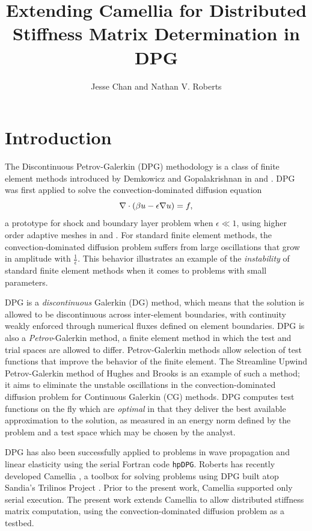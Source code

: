 \documentclass{article}
\date{}
\author{Jesse Chan and Nathan V. Roberts}
\title{Extending Camellia for Distributed Stiffness Matrix Determination in DPG}
\begin{document}
\maketitle

\section{Introduction}

The Discontinuous Petrov-Galerkin (DPG) methodology is a class of finite element methods introduced by Demkowicz and Gopalakrishnan in \cite{DPG1} and \cite{DPG2}. DPG was first applied to solve the convection-dominated diffusion equation
\[
\div \left(\beta u - \epsilon\grad u\right) = f,
\]
a prototype for shock and boundary layer problem when $\epsilon \ll 1$, using higher order adaptive meshes in \cite{DPG2} and \cite{DPG3}. For standard finite element methods, the convection-dominated diffusion problem suffers from large oscillations that grow in amplitude with $\frac{1}{\epsilon}$. This behavior illustrates an example of the \emph{instability} of standard finite element methods when it comes to problems with small parameters.
 
DPG is a \emph{discontinuous} Galerkin (DG) method, which means that the solution is allowed to be discontinuous across inter-element boundaries, with continuity weakly enforced through numerical fluxes defined on element boundaries. DPG is also a \emph{Petrov}-Galerkin method, a finite element method in which the test and trial spaces are allowed to differ. Petrov-Galerkin methods allow selection of test functions that improve the behavior of the finite element. The Streamline Upwind Petrov-Galerkin method of Hughes and Brooks \cite{SUPG} is an example of such a method; it aims to eliminate the unstable oscillations in the convection-dominated diffusion problem for Continuous Galerkin (CG) methods.  DPG computes test functions on the fly which are \emph{optimal} in that they deliver the best available approximation to the solution, as measured in an energy norm defined by the problem and a test space which may be chosen by the analyst.

DPG has also been successfully applied to problems in wave propagation and linear elasticity \cite{DPG4,DPGElas} using the serial Fortran code \verb+hpDPG+.  Roberts has recently developed Camellia \cite{Camellia}, a toolbox for solving problems using DPG built atop Sandia's Trilinos Project \cite{Trilinos-Overview}.  Prior to the present work, Camellia supported only serial execution.  The present work extends Camellia to allow distributed stiffness matrix computation, using the convection-dominated diffusion problem as a testbed. 
\end{document}
